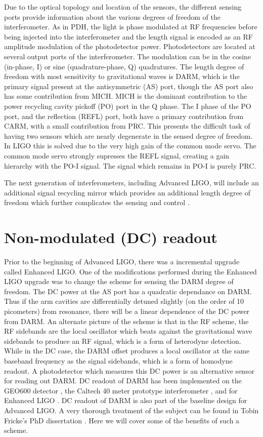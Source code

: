 Due to the optical topology and location of the sensors, the different sensing ports provide information about the various degrees of freedom of the interferometer. %
As in PDH, the light is phase modulated at RF frequencies before being injected into the interferometer and the length signal is encoded as an RF amplitude modulation of the photodetector power. %
Photodetectors are located at several output ports of the interferometer. %
The modulation can be in the cosine (in-phase, I) or sine (quadrature-phase, Q) quadratures. %
The length degree of freedom with most sensitivity to gravitational waves is DARM, which is the primary signal present at the antisymmetric (AS) port, though the AS port also has some contribution from MICH. %
MICH is the dominant contribution to the power recycling cavity pickoff (PO) port in the Q phase. %
The I phase of the PO port, and the reflection (REFL) port, both have a primary contribution from CARM, with a small contribution from PRC. %
This presents the difficult task of having two sensors which are nearly degenerate in the sensed degree of freedom. %
In LIGO this is solved due to the very high gain of the common mode servo. %
The common mode servo strongly supresses the REFL signal, creating a gain hierarchy with the PO-I signal. %
The signal which remains in PO-I is purely PRC.

The next generation of interferometers, including Advanced LIGO, will include an additional signal recycling mirror which provides an additional length degree of freedom which further complicates the sensing and control \cite{T1000298}.

\section{Non-modulated (DC) readout}
Prior to the beginning of Advanced LIGO, there was a incremental upgrade called Enhanced LIGO. %
One of the modifications performed during the Enhanced LIGO upgrade was to change the scheme for sensing the DARM degree of freedom. %
The DC power at the AS port has a quadratic dependance on DARM. %
Thus if the arm cavities are differentially detuned slightly (on the order of 10 picometers) from resonance, there will be a linear dependence of the DC power from DARM. %
An alternate picture of the scheme is that in the RF scheme, the RF sidebands are the local oscillator which beats against the gravitational wave sidebands to produce an RF signal, which is a form of heterodyne detection. %
While in the DC case, the DARM offset produces a local oscillator at the same baseband frequency as the signal sidebands, which is a form of homodyne readout. %
A photodetector which measures this DC power is an alternative sensor for reading out DARM. %
DC readout of DARM has been implemented on the GEO600 detector \cite{GEODC}, the Caltech 40 meter prototype interferometer \cite{40mDC}, and for Enhanced LIGO \cite{Tobin}. %
DC readout of DARM is also part of the baseline design for Advanced LIGO. %
A very thorough treatment of the subject can be found in Tobin Fricke's PhD dissertation \cite{FrickeThesis}. %
Here we will cover some of the benefits of such a scheme.

